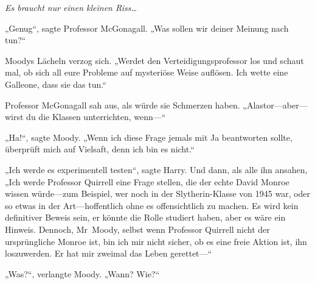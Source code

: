 \emph{Es braucht nur einen kleinen Riss…}

„Genug“, sagte Professor McGonagall. „Was sollen wir deiner Meinung nach tun?“

Moodys Lächeln verzog sich. „Werdet den Verteidigungsprofessor los und schaut mal, ob sich all eure Probleme auf mysteriöse Weise auflösen. Ich wette eine Galleone, dass sie das tun.“

Professor McGonagall sah aus, als würde sie Schmerzen haben.
„Alastor—aber—wirst du die Klassen unterrichten, wenn—“

„Ha!“, sagte Moody. „Wenn ich diese Frage jemals mit Ja beantworten sollte, überprüft mich auf Vielsaft, denn ich bin es nicht.“

„Ich werde es experimentell testen“, sagte Harry. Und dann, als alle ihn ansahen, „Ich werde Professor Quirrell eine Frage stellen, die der echte David Monroe wissen würde—zum Beispiel, wer noch in der Slytherin-Klasse von 1945 war, oder so etwas in der Art—hoffentlich ohne es offensichtlich zu machen. Es wird kein definitiver Beweis sein, er könnte die Rolle studiert haben, aber es wäre ein Hinweis. Dennoch, Mr~Moody, selbst wenn Professor Quirrell nicht der ursprüngliche Monroe ist, bin ich mir nicht sicher, ob es eine freie Aktion ist, ihn loszuwerden. Er hat mir zweimal das Leben gerettet—“

„Was?“, verlangte Moody. „Wann? Wie?“

